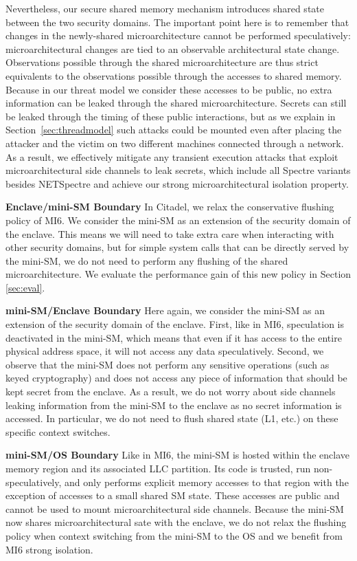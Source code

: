 Nevertheless, our secure shared memory mechanism introduces shared state between the two security domains. 
The important point here is to remember that changes in the newly-shared microarchitecture cannot be performed speculatively:
microarchitectural changes are tied to an observable architectural state change.
Observations possible through the shared microarchitecture are thus strict equivalents to the observations possible through the accesses to shared memory.
Because in our threat model we consider these accesses to be public, no extra information can be leaked through the shared microarchitecture. 
Secrets can still be leaked through the timing of these public interactions, but as we explain in Section~\ref{sec:threadmodel} such attacks could be mounted even after placing the attacker and the victim on two different machines connected through a network.
As a result, we effectively mitigate any transient execution attacks that exploit microarchitectural side channels to leak secrets, which include all Spectre variants besides NETSpectre \cite{schwarz2019netspectre} and achieve our strong microarchitectural isolation property.

\textbf{Enclave/mini-SM Boundary}
In Citadel, we relax the conservative flushing policy of MI6.
We consider the mini-SM as an extension of the security domain of the enclave.
This means we will need to take extra care when interacting with other security domains, but for simple system calls that can be directly served by the mini-SM, we do not need to perform any flushing of the shared microarchitecture.
We evaluate the performance gain of this new policy in Section \ref{sec:eval}.

\textbf{mini-SM/Enclave Boundary}
Here again, we consider the mini-SM as an extension of the security domain of the enclave.
First, like in MI6, speculation is deactivated in the mini-SM, which means that even if it has access to the entire physical address space, it will not access any data speculatively.
Second, we observe that the mini-SM does not perform any sensitive operations (such as keyed cryptography) and does not access any piece of information that should be kept secret from the enclave.
As a result, we do not worry about side channels leaking information from the mini-SM to the enclave as no secret information is accessed.
In particular, we do not need to flush shared state (L1, etc.) on these specific context switches.

\textbf{mini-SM/OS Boundary}
Like in MI6, the mini-SM is hosted within the enclave memory region and its associated LLC partition. 
Its code is trusted, run non-speculatively, and only performs explicit memory accesses to that region with the exception of accesses to a small shared SM state. 
These accesses are public and cannot be used to mount microarchitectural side channels.
Because the mini-SM now shares microarchitectural sate with the enclave, we do not relax the flushing policy when context switching from the mini-SM to the OS and we benefit from MI6 strong isolation.

